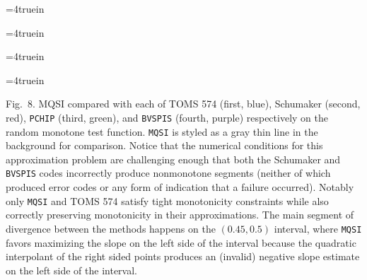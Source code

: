 \topinsert
\centerline{\epsfxsize=4truein }
\centerline{\epsfxsize=4truein }
\centerline{\epsfxsize=4truein }
\centerline{\epsfxsize=4truein }
{\narrower\noindent\rmVIII Fig.\ 8.
{\ttVIII MQSI} compared with each of TOMS 574 (first, blue), Schumaker
(second, red), {\tt PCHIP} (third, green), and {\tt BVSPIS} (fourth, purple)
respectively on the {\itVIII random monotone} test function. {\tt MQSI} is
styled as a gray thin line in the background for comparison. Notice
that the numerical conditions for this approximation problem are
challenging enough that both the Schumaker and {\tt BVSPIS} codes
incorrectly produce nonmonotone segments (neither of which produced
error codes or any form of indication that a failure
occurred). Notably only {\tt MQSI} and TOMS 574 satisfy tight monotonicity
constraints while also correctly preserving monotonicity in their
approximations. The main segment of divergence between the methods
happens on the $(0.45, 0.5)$ interval, where {\tt MQSI} favors maximizing
the slope on the left side of the interval because the quadratic
interpolant of the right sided points produces an (invalid) negative
slope estimate on the left side of the interval.
\par}
\endinsert
